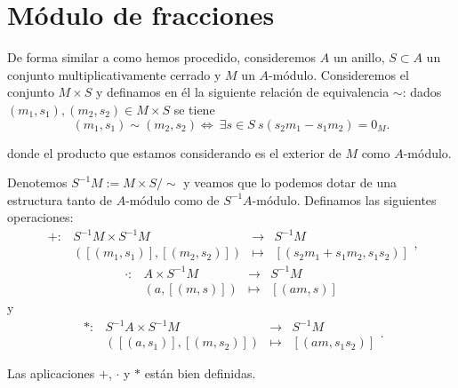 \documentclass[../main.tex]{subfiles}
\begin{document}
	\section{Módulo de fracciones}
	De forma similar a como hemos procedido, consideremos $A$ un anillo, $S\subset A$ un conjunto multiplicativamente cerrado y $M$ un $A$-módulo. Consideremos el conjunto $M\times S$ y definamos en él la siguiente relación de equivalencia $\sim$: dados $(m_1,s_1),(m_2,s_2)\in M\times S$ se tiene
	$$(m_1,s_1)\sim(m_2,s_2)\Longleftrightarrow\ \exists s\in S\ s(s_2m_1-s_1m_2)=0_M.$$

	donde el producto que estamos considerando es el exterior de $M$ como $A$-módulo.

	Denotemos $S^{-1}M:=M\times S/\sim$ y veamos que lo podemos dotar de una estructura tanto de $A$-módulo como de $S^{-1}A$-módulo. Definamos las siguientes operaciones:
	$$\begin{array}{rrcl}
	+:&S^{-1}M\times S^{-1}M&\longrightarrow&S^{-1}M  \\
	&([(m_1,s_1)],[(m_2,s_2)])&\longmapsto&[(s_2m_1+s_1m_2,s_1s_2)]
	\end{array},$$
	$$\begin{array}{rrcl}
	·:&A\times S^{-1}M&\longrightarrow&S^{-1}M  \\
	&(a,[(m,s)])&\longmapsto&[(am,s)]
	\end{array}$$
	y
	$$\begin{array}{rrcl}
	*:&S^{-1}A\times S^{-1}M&\longrightarrow&S^{-1}M  \\
	&([(a,s_1)],[(m,s_2)])&\longmapsto&[(am,s_1s_2)]
	\end{array}.$$

	\begin{proposition}
		Las aplicaciones $+$, $·$ y $*$ están bien definidas.
	\end{proposition}
\end{document}
